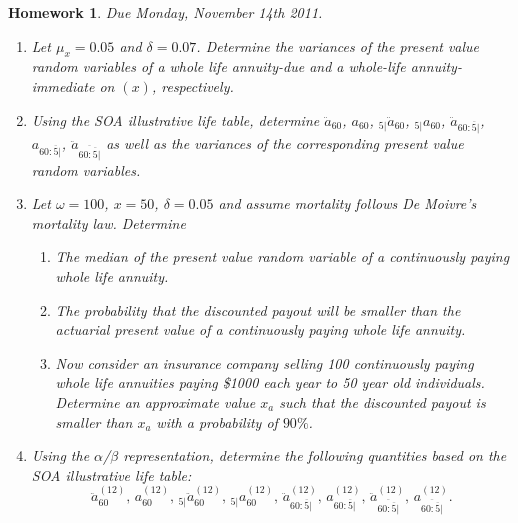 \documentclass[11pt,fleqn,oneside]{book}
\newtheorem{homework}{Homework}
\begin{document}
\begin{homework}
\label{HW18}
\textit{Due Monday, November 14th 2011.}
\begin{enumerate}
\item Let $\mu_x = 0.05$ and $\delta =0.07$. Determine the variances of the present value random variables of a whole life annuity-due and a whole-life annuity-immediate on $(x)$, respectively.
\item Using the SOA illustrative life table, determine $\ddot{a}_{60}$, $a_{60}$, ${_{5|}\ddot{a}_{60}}$, ${_{5|}a_{60}}$, $\ddot{a}_{60:\overline{5}|}$, $a_{60:\overline{5}|}$, $\ddot{a}_{\overline{60:\overline{5}|}}$ as well as the variances of the corresponding present value random variables.  
\item Let $\omega=100$, $x=50$, $\delta = 0.05$ and assume mortality follows De Moivre's mortality law. Determine
\begin{enumerate}
\item The median of the present value random variable of a continuously paying whole life annuity.
\item The probability that the discounted payout will be smaller than the actuarial present value of a continuously paying whole life annuity.
\item Now consider an insurance company selling 100 continuously paying whole life annuities paying \$1000 each year to 50 year old individuals. Determine an approximate value $x_a$ such that the discounted payout is smaller than $x_a$ with a probability of $90\%$.
\end{enumerate}
\item Using the $\alpha$/$\beta$ representation, determine the following quantities based on the SOA illustrative life table:
$$
\ddot{a}_{60}^{(12)},\,a_{60}^{(12)},\,{_{5|}\ddot{a}_{60}^{(12)}} ,\,{_{5|}a_{60}^{(12)}},\,{\ddot{a}_{{60}:\overline{5}|}^{(12)}} ,\,{a_{{60}:\overline{5}|}^{(12)}},\, \ddot{a}_{\overline{{60}:\overline{5}|}}^{(12)},\,a_{\overline{{60}:\overline{5}|}}^{(12)}. 
$$
\end{enumerate}
\end{homework}
\end{document}
